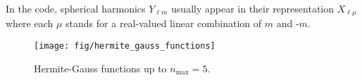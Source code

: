 \documentclass[oribibl]{llncs}
\newcommand{\um}[1]{_{\mathrm{#1}}}
\begin{document}
In the code, spherical harmonics $Y_{\ell m}$ usually appear in their representation
$X_{\ell \mu}$ where each $\mu$ stands for a real-valued linear combination of $m$ and -$m$.

\begin{figure}
  \begin{minipage}[c]{.990\textwidth}
	\texttt{[image: fig/hermite\_gauss\_functions]} %
  \end{minipage}\hfill
  \begin{minipage}[c]{.009\textwidth}
  \end{minipage}
  \label{fig:hermite_gauss_function}
  \caption{
  Hermite-Gauss functions up to $n\um{max} = 5$.
  }
\end{figure}
\end{document}
